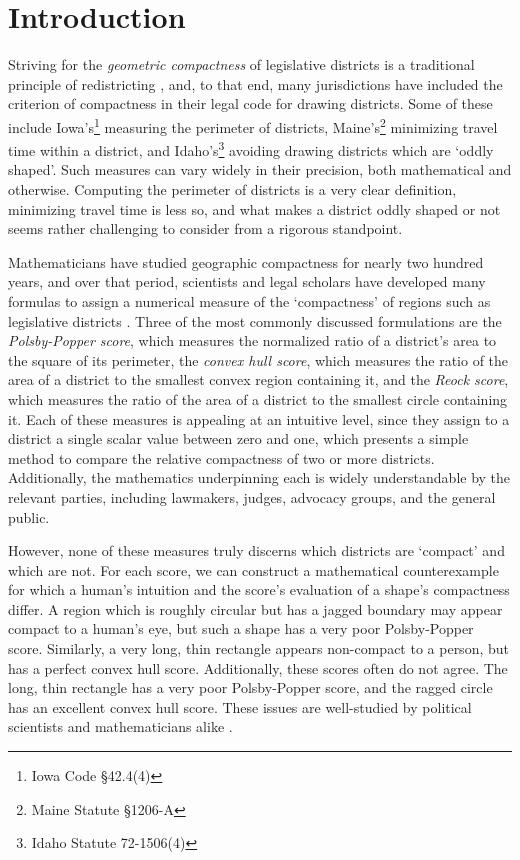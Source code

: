 \section{Introduction}
Striving for the \textit{geometric compactness} of legislative
districts is a traditional principle of redistricting \cite{altman_1998}, and, to that
end, many jurisdictions have included the criterion of compactness in
their legal code for drawing districts.  Some of these include Iowa's\footnote{Iowa Code \S42.4(4)} measuring the perimeter of districts, Maine's\footnote{Maine Statute \S1206-A} minimizing travel time within a district, and Idaho's\footnote{Idaho Statute 72-1506(4)} avoiding 
drawing districts which are `oddly shaped'.  Such measures can vary widely in their 
precision, both mathematical and otherwise.  Computing the perimeter of districts is a very clear definition, minimizing travel time is less so, and what makes a district oddly shaped or not seems rather challenging to consider from a rigorous standpoint. 


Mathematicians have studied geographic compactness for nearly two hundred years, and over that period, scientists and legal scholars have developed many formulas to assign a numerical measure of the `compactness' of regions such as legislative districts \cite{young_compactness}.
 Three of the most commonly discussed formulations are the \textit{Polsby-Popper score}, which
measures the normalized ratio of a district's area to the square of its
perimeter, the \textit{convex hull score}, which measures the ratio
of the area of a district to the smallest convex region containing it,
and the \textit{Reock score}, which measures the ratio of the area of
a district to the smallest circle containing it.  Each of these
measures is appealing at an intuitive level, since they assign to
a district a single scalar value between zero and one, which presents a simple 
method to compare the relative compactness of two or more districts. 
Additionally, the
mathematics underpinning each is widely understandable by the relevant
parties, including lawmakers, judges, advocacy groups, and the general
public.  

However, none of these measures truly discerns which districts are `compact' and which are not. 
For each score, we can construct a 
mathematical counterexample for which
a human's intuition and the score's evaluation of a shape's
compactness differ.  A region which is roughly circular but has a jagged boundary 
may appear compact to a human's eye, but such a shape has a very poor Polsby-Popper score.  Similarly, a very long, thin rectangle appears non-compact to a person, but has a perfect convex hull score.  Additionally, these scores often do not agree.
The long, thin rectangle has a  very
poor Polsby-Popper score, and the ragged circle has an excellent convex hull score.  These issues are well-studied by political
scientists and mathematicians alike
\cite{polsby1991third,frolov1975shape,maceachren1985compact}.




